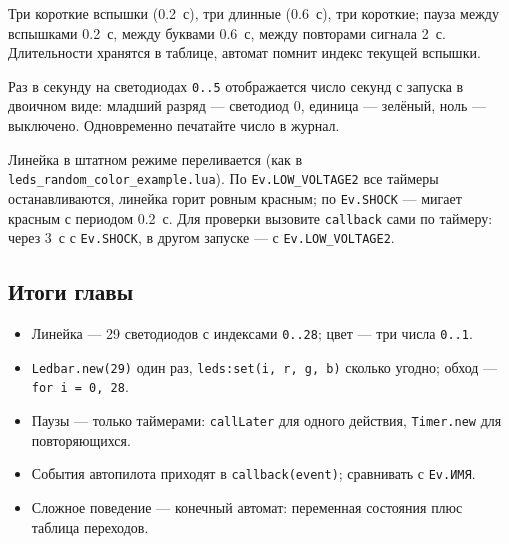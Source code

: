 \begin{taskbox}
Три короткие вспышки (0.2~с), три длинные (0.6~с), три короткие; пауза между вспышками 0.2~с, между буквами 0.6~с, между повторами сигнала 2~с. Длительности хранятся в таблице, автомат помнит индекс текущей вспышки.
\end{taskbox}

\begin{taskbox}
Раз в секунду на светодиодах \verb|0..5| отображается число секунд с запуска в двоичном виде: младший разряд --- светодиод 0, единица --- зелёный, ноль --- выключено. Одновременно печатайте число в журнал.
\end{taskbox}

\begin{taskbox}[Авария]
Линейка в штатном режиме переливается (как в \texttt{leds\_random\_color\_example.lua}). По \verb|Ev.LOW_VOLTAGE2| все таймеры останавливаются, линейка горит ровным красным; по \verb|Ev.SHOCK| --- мигает красным с периодом 0.2~с. Для проверки вызовите \verb|callback| сами по таймеру: через 3~с с \verb|Ev.SHOCK|, в другом запуске --- с \verb|Ev.LOW_VOLTAGE2|.
\end{taskbox}

\subsection*{Итоги главы}
\begin{itemize}
    \item Линейка --- 29 светодиодов с индексами \verb|0..28|; цвет --- три числа \verb|0..1|.
    \item \verb|Ledbar.new(29)| один раз, \verb|leds:set(i, r, g, b)| сколько угодно; обход --- \verb|for i = 0, 28|.
    \item Паузы --- только таймерами: \verb|callLater| для одного действия, \verb|Timer.new| для повторяющихся.
    \item События автопилота приходят в \verb|callback(event)|; сравнивать с \verb|Ev.ИМЯ|.
    \item Сложное поведение --- конечный автомат: переменная состояния плюс таблица переходов.
\end{itemize}
